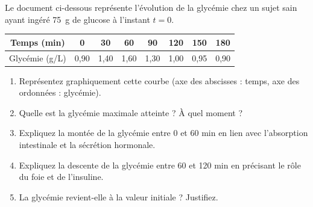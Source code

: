 \documentclass[11pt]{article}
\begin{document}
\begin{exercice}
Le document ci-dessous représente l'évolution de la glycémie chez un sujet sain ayant ingéré \SI{75}{g} de glucose à l'instant $t=0$.
\begin{center}
\begin{tabular}{c|ccccccc}
\hline
Temps (min) & 0 & 30 & 60 & 90 & 120 & 150 & 180 \\
\hline
Glycémie (g/L) & 0,90 & 1,40 & 1,60 & 1,30 & 1,00 & 0,95 & 0,90 \\
\hline
\end{tabular}
\end{center}
\begin{enumerate}
\item Représentez graphiquement cette courbe (axe des abscisses : temps, axe des ordonnées : glycémie).
\item Quelle est la glycémie maximale atteinte ? À quel moment ?
\item Expliquez la montée de la glycémie entre 0 et 60 min en lien avec l'absorption intestinale et la sécrétion hormonale.
\item Expliquez la descente de la glycémie entre 60 et 120 min en précisant le rôle du foie et de l'insuline.
\item La glycémie revient-elle à la valeur initiale ? Justifiez.
\end{enumerate}
\end{exercice}
\end{document}
